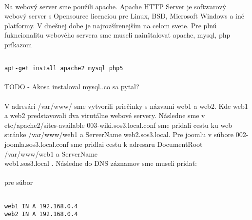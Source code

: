\paragraph{}
Na webový server sme použili apache. Apache HTTP Server je softwarový webový server s Opensource licenciou pre Linux, BSD, Microsoft Windows a iné platformy. V dnešnej dobe je najrozšírenejším na celom svete. Pre plnú fukncionalitu webového servera sme museli nainštalovať apache, mysql, php príkazom

\noindent
{\selectfont
\begin{small}
\begin{verbatim}

apt-get install apache2 mysql php5

\end{verbatim}
\end{small}
}

\paragraph{}
TODO - Akosa instaloval mysql..co sa pytal?

\paragraph{}
V adresári /var/www/ sme vytvorili priečinky s názvami web1 a web2. Kde web1 a web2 predstavovali dva virutálne webové servery. Následne sme v etc/apache2/sites-available 003-wiki.sos3.local.conf sme pridali cestu ku web stránke /var/www/web1 a ServerName web2.sos3.local. Pre joomlu v súbore 002-joomla.sos3.local.conf sme pridlai cestu k adresaru DocumentRoot /var/www/web1 a ServerName\\ web1.sos3.local . Následne do DNS záznamov sme museli pridať:	

\paragraph{}
pre súbor 

\noindent
{\selectfont

\begin{small}

\begin{verbatim}

web1 IN A 192.168.0.4
web2 IN A 192.168.0.4


\end{verbatim}
\end{small}
}

